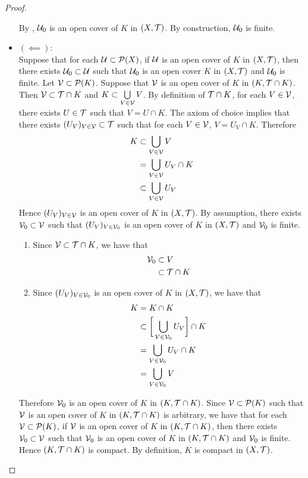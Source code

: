 \documentclass{book}
\begin{document}
\begin{proof}
\begin{itemize}
			By , $\mathcal{U}_0$ is an open cover of $K$ in $(X, \mathcal{T})$. By construction, $\mathcal{U}_0$ is finite. 
			\item $(\impliedby)$: \\
			Suppose that for each $\mathcal{U} \subset \mathcal{P}(X)$, if $\mathcal{U}$ is an open cover of $K$ in $(X, \mathcal{T})$, then there exists $\mathcal{U}_0 \subset \mathcal{U}$ such that $\mathcal{U}_0$ is an open cover $K$ in $(X, \mathcal{T})$ and $\mathcal{U}_0$ is finite. Let $\mathcal{V} \subset \mathcal{P}(K)$. Suppose that $\mathcal{V}$ is an open cover of $K$ in $(K, \mathcal{T} \cap K)$. Then $\mathcal{V} \subset \mathcal{T} \cap K$ and $K \subset \bigcup\limits_{V \in \mathcal{V}} V$. By definition of $\mathcal{T} \cap K$, for each $V \in \mathcal{V}$, there exists $U \in \mathcal{T}$ such that $V = U \cap K$. The axiom of choice implies that there exists $(U_V)_{V \in \mathcal{V}} \subset \mathcal{T}$ such that for each $V \in \mathcal{V}$, $V = U_V \cap K$. Therefore
			\begin{align*}
				K 
				& \subset \bigcup_{V \in \mathcal{V}} V \\
				& = \bigcup_{V \in \mathcal{V}} U_V \cap K \\
				& \subset \bigcup_{V \in \mathcal{V}} U_V \\
			\end{align*}
			Hence $(U_V)_{V \in \mathcal{V}}$ is an open cover of $K$ in $(X, \mathcal{T})$. By assumption, there exists $\mathcal{V}_0 \subset \mathcal{V}$ such that $(U_V)_{V \in \mathcal{V}_0}$ is an open cover of $K$ in $(X, \mathcal{T})$ and $\mathcal{V}_0$ is finite. 
			\begin{enumerate}
				\item Since $\mathcal{V} \subset \mathcal{T} \cap K$, we have that 
				\begin{align*}
					\mathcal{V}_0 
					& \subset V \\
					& \subset \mathcal{T} \cap K
				\end{align*}
				\item Since $(U_V)_{V \in \mathcal{V}_0}$ is an open cover of $K$ in $(X, \mathcal{T})$, we have that
				\begin{align*}
					K 
					& = K \cap K \\
					& \subset \bigg[ \bigcup_{V \in \mathcal{V}_0} U_V \bigg] \cap K  \\
					& = \bigcup_{V \in \mathcal{V}_0} U_V \cap K \\
					& = \bigcup_{V \in \mathcal{V}_0} V \\
				\end{align*}
			\end{enumerate}
			Therefore $\mathcal{V}_0$ is an open cover of $K$ in $(K, \mathcal{T} \cap K)$. Since $\mathcal{V} \subset \mathcal{P}(K)$ such that $\mathcal{V}$ is an open cover of $K$ in $(K, \mathcal{T} \cap K)$ is arbitrary, we have that for each $\mathcal{V} \subset \mathcal{P}(K)$, if $\mathcal{V}$ is an open cover of $K$ in $(K, \mathcal{T} \cap K)$, then there exists $\mathcal{V}_0 \subset \mathcal{V}$ such that $\mathcal{V}_0$ is an open cover of $K$ in $(K, \mathcal{T} \cap K)$ and $\mathcal{V}_0$ is finite. Hence $(K, \mathcal{T} \cap K)$ is compact. By definition, $K$ is compact in $(X, \mathcal{T})$.
		\end{itemize}
	\end{proof}
\end{document}
